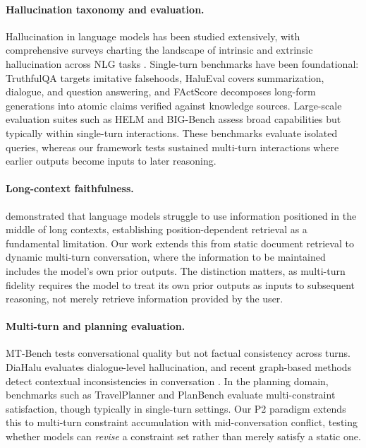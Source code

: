 \documentclass[11pt,a4paper]{article}
\begin{document}
\paragraph{Hallucination taxonomy and evaluation.}
Hallucination in language models has been studied extensively, with comprehensive surveys charting the landscape of intrinsic and extrinsic hallucination across NLG tasks \citep{ji2023survey}. Single-turn benchmarks have been foundational: TruthfulQA \citep{lin2022truthfulqa} targets imitative falsehoods, HaluEval \citep{li2023halueval} covers summarization, dialogue, and question answering, and FActScore \citep{min2023factscore} decomposes long-form generations into atomic claims verified against knowledge sources. Large-scale evaluation suites such as HELM \citep{liang2023helm} and BIG-Bench \citep{srivastava2023beyond} assess broad capabilities but typically within single-turn interactions. These benchmarks evaluate isolated queries, whereas our framework tests sustained multi-turn interactions where earlier outputs become inputs to later reasoning.

\paragraph{Long-context faithfulness.}
\citet{liu2024lost} demonstrated that language models struggle to use information positioned in the middle of long contexts, establishing position-dependent retrieval as a fundamental limitation. Our work extends this from static document retrieval to dynamic multi-turn conversation, where the information to be maintained includes the model's own prior outputs. The distinction matters, as multi-turn fidelity requires the model to treat its own prior outputs as inputs to subsequent reasoning, not merely retrieve information provided by the user.

\paragraph{Multi-turn and planning evaluation.}
MT-Bench \citep{zheng2023judging} tests conversational quality but not factual consistency across turns. DiaHalu \citep{chen2024diahalu} evaluates dialogue-level hallucination, and recent graph-based methods detect contextual inconsistencies in conversation \citep{rathore2026temporal}. In the planning domain, benchmarks such as TravelPlanner \citep{xie2024travelplanner} and PlanBench \citep{valmeekam2023planbench} evaluate multi-constraint satisfaction, though typically in single-turn settings. Our P2 paradigm extends this to multi-turn constraint accumulation with mid-conversation conflict, testing whether models can \emph{revise} a constraint set rather than merely satisfy a static one.
\end{document}
